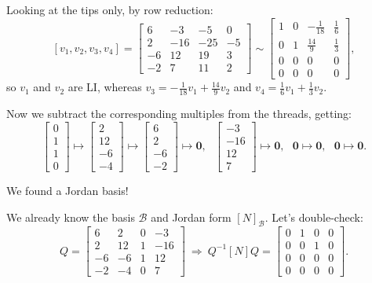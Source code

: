 \documentclass[12pt]{article}
\newcommand{\1}{\mathbf{1}}
\newcommand{\0}{\mathbf{0}}
\newcommand{\B}{\mathcal{B}}
\theoremstyle{definition}
\begin{document}
Looking at the tips only, by row reduction:
\[
[v_1, v_2, v_3, v_4] =
\left[\begin{matrix}6 & -3 & -5 & 0\\2 & -16 & -25 & -5\\-6 & 12 & 19 & 3\\-2 & 7 & 11 & 2\end{matrix}\right]
\sim
\left[\begin{matrix}1 & 0 & - \frac{1}{18} & \frac{1}{6}\\0 & 1 & \frac{14}{9} & \frac{1}{3}\\0 & 0 & 0 & 0\\0 & 0 & 0 & 0\end{matrix}\right]
,
\]
so $v_1$ and $v_2$ are LI, whereas $v_3 = -\frac{1}{18} v_1 + \frac{14}{9} v_2$ and $v_4 = \frac{1}{6} v_1 + \frac{1}{3} v_2$.

Now we subtract the corresponding multiples from the threads, getting:
\[
\left[\begin{matrix}0\\1\\1\\0\end{matrix}\right]
\mapsto
\left[\begin{matrix}2\\12\\-6\\-4\end{matrix}\right]
\mapsto
\left[\begin{matrix}6\\2\\-6\\-2\end{matrix}\right]
\mapsto
\0
, \ \ \
\left[\begin{matrix}-3\\-16\\12\\7\end{matrix}\right]
\mapsto
\0
, \ \ \
\0
\mapsto
\0
, \ \ \
\0
\mapsto
\0
.
\]

We found a Jordan basis!

We already know the basis $ \B $ and Jordan form $ [N]_\B $.
Let's double-check:
\[
Q=
\left[\begin{matrix}6 & 2 & 0 & -3\\2 & 12 & 1 & -16\\-6 & -6 & 1 & 12\\-2 & -4 & 0 & 7\end{matrix}\right]
\
\Longrightarrow
\
Q^{-1} [N] Q = 
\left[\begin{array}{rrr|r} 0 & 1 & 0 & 0\\0 & 0 & 1 & 0\\0 & 0 & 0 & 0 \\ \hline 0 & 0 & 0 & 0\end{array}\right]
.
\]
\end{document}
